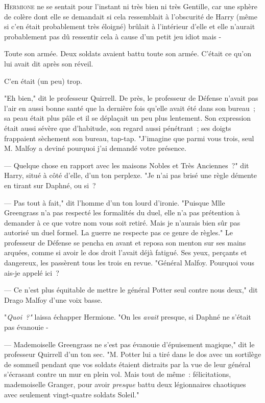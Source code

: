 
\lettrine{H}{ermione} ne se sentait pour l'instant ni très bien ni très Gentille, car une sphère de colère dont elle se demandait si cela ressemblait à l'obscurité de Harry (même si c'en était probablement très éloigné) brûlait à l'intérieur d'elle et elle n'aurait probablement pas dû ressentir cela à cause d'un petit jeu idiot mais -

Toute son armée. Deux soldats avaient battu toute son armée. C'était ce qu'on lui avait dit après son réveil.

C'en était (un peu) trop.

"Eh bien," dit le professeur Quirrell. De près, le professeur de Défense n'avait pas l'air en aussi bonne santé que la dernière fois qu'elle avait été dans son bureau~; sa peau était plus pâle et il se déplaçait un peu plus lentement. Son expression était aussi sévère que d'habitude, son regard aussi pénétrant~; ses doigts frappaient sèchement son bureau, tap-tap. "J'imagine que parmi vous trois, seul M. Malfoy a deviné pourquoi j'ai demandé votre présence.

--- Quelque chose en rapport avec les maisons Nobles et Très Anciennes~?" dit Harry, situé à côté d'elle, d'un ton perplexe. "Je n'ai pas brisé une règle démente en tirant sur Daphné, ou si~?

--- Pas tout à fait," dit l'homme d'un ton lourd d'ironie. "Puisque Mlle Greengrass n'a pas respecté les formalités du duel, elle n'a pas prétention à demander à ce que votre nom vous soit retiré. Mais je n'aurais bien sûr pas autorisé un duel formel. La guerre ne respecte pas ce genre de règles." Le professeur de Défense se pencha en avant et reposa son menton sur ses mains arquées, comme si avoir le dos droit l'avait déjà fatigué. Ses yeux, perçants et dangereux, les passèrent tous les trois en revue. "Général Malfoy. Pourquoi vous ais-je appelé ici~?

--- Ce n'est plus équitable de mettre le général Potter seul contre nous deux," dit Drago Malfoy d'une voix basse.

"\emph{Quoi~?"} laissa échapper Hermione. "On les \emph{avait} presque, si Daphné ne s'était pas évanouie -

--- Mademoiselle Greengrass ne s'est pas évanouie d'épuisement magique," dit le professeur Quirrell d'un ton sec. "M. Potter lui a tiré dans le dos avec un sortilège de sommeil pendant que vos soldats étaient distraits par la vue de leur général s'écrasant contre un mur en plein vol. Mais tout de même~: félicitations, mademoiselle Granger, pour avoir \emph{presque} battu deux légionnaires chaotiques avec seulement vingt-quatre soldats Soleil."

